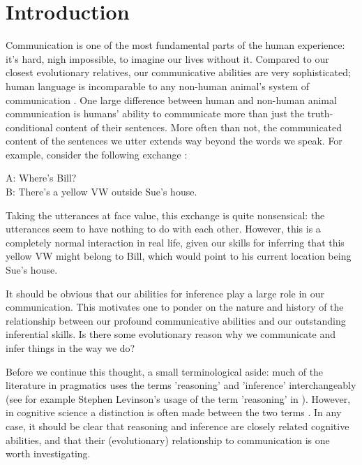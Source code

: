 \chapter*{Introduction}
\label{ch:introduction}


Communication is one of the most fundamental parts of the human experience: it's hard, nigh impossible, to imagine our lives without it. Compared to our closest evolutionary relatives, our communicative abilities are very sophisticated; human language is incomparable to any non-human animal's system of communication \citep{CheneySeyfarth98}.
One large difference between human and non-human animal communication is humans' ability to communicate more than just the truth-conditional content of their sentences. More often than not, the communicated content of the sentences we utter extends way beyond the words we speak. For example, consider the following exchange \citep[taken from][p.~102]{Levinson83}:
\begin{quoting}
    A: Where's Bill? \\
    B: There's a yellow VW outside Sue's house.
\end{quoting}
Taking the utterances at face value, this exchange is quite nonsensical: the utterances seem to have nothing to do with each other. However, this is a completely normal interaction in real life, given our skills for inferring that this yellow VW might belong to Bill, which would point to his current location being Sue's house.

It should be obvious that our abilities for inference play a large role in our communication. This motivates one to ponder on the nature and history of the relationship between our profound communicative abilities and our outstanding inferential skills. Is there some evolutionary reason why we communicate and infer things in the way we do?


Before we continue this thought, a small terminological aside: much of the literature in pragmatics uses the terms 'reasoning' and 'inference' interchangeably (see for example Stephen Levinson's usage of the term 'reasoning' in \citealp[p.~218]{Levinson83}). However, in cognitive science a distinction is often made between the two terms \citep[see][first paragraph]{MS11}.
In any case, it should be clear that reasoning and inference are closely related cognitive abilities, and that their (evolutionary) relationship to communication is one worth investigating.

